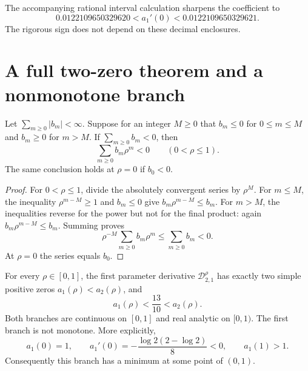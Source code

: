 The accompanying rational interval calculation sharpens the coefficient
to
\[
 0.0122109650329620<a_1'(0)<0.0122109650329621.
\]
The rigorous sign does not depend on these decimal enclosures.

\section{A full two-zero theorem and a nonmonotone branch}
\label{lerchboundary:sec:n2}

\begin{lemma}
\label{lerchboundary:lem:coefficient-sign}
Let $\sum_{m\geq0}|b_m|<\infty$. Suppose for an integer $M\geq0$ that
$b_m\leq0$ for $0\leq m\leq M$ and $b_m\geq0$ for $m>M$.
If $\sum_{m\geq0}b_m<0$, then
\[
 \sum_{m\geq0}b_m\rho^m<0\qquad(0<\rho\leq1).
\]
The same conclusion holds at $\rho=0$ if $b_0<0$.
\end{lemma}

\begin{proof}
For $0<\rho\leq1$, divide the absolutely convergent series by $\rho^M$.
For $m\leq M$, the inequality $\rho^{m-M}\geq1$ and $b_m\leq0$ give
$b_m\rho^{m-M}\leq b_m$. For $m>M$, the inequalities reverse for the
power but not for the final product: again
$b_m\rho^{m-M}\leq b_m$. Summing proves
\[
 \rho^{-M}\sum_{m\geq0}b_m\rho^m\leq\sum_{m\geq0}b_m<0.
\]
At $\rho=0$ the series equals $b_0$.
\end{proof}

\begin{theorem}
\label{lerchboundary:thm:n2global}
For every $\rho\in[0,1]$, the first parameter derivative
$\mathcal D_{2,1}^{\rho}$ has exactly two simple positive zeros
$a_1(\rho)<a_2(\rho)$, and
\begin{equation}\label{lerchboundary:eq:n2bracket}
 a_1(\rho)<\frac{13}{10}<a_2(\rho).
\end{equation}
Both branches are continuous on $[0,1]$ and real analytic on $[0,1)$.
The first branch is not monotone. More explicitly,
\begin{equation}\label{lerchboundary:eq:n2derivative}
 a_1(0)=1,\qquad
 a_1'(0)=-\frac{\log2(2-\log2)}8<0,
 \qquad a_1(1)>1.
\end{equation}
Consequently this branch has a minimum at some point of $(0,1)$.
\end{theorem}

